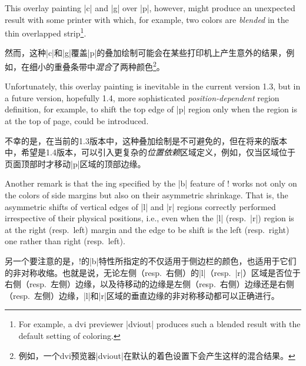 This overlay painting |c| and |g| over |p|, however, might produce an
unexpected result with some printer with which, for example, two colors
are \emph{blended} in the thin overlapped strip\footnote{%
For example, a dvi previewer |dviout| produces such a blended result with
the default setting of coloring.}.

然而，这种|c|和|g|覆盖|p|的叠加绘制可能会在某些打印机上产生意外的结果，例如，在细小的重叠条带中\emph{混合}了两种颜色\footnote{例如，一个dvi预览器|dviout|在默认的着色设置下会产生这样的混合结果。}。

Unfortunately, this overlay painting is inevitable in the current version
1.3, but in a future version, hopefully 1.4, more sophisticated
\emph{position-dependent} region definition, for example, to shift the top
edge of |p| region only when the region is at the top of page, could be
introduced.

不幸的是，在当前的1.3版本中，这种叠加绘制是不可避免的，但在将来的版本中，希望是1.4版本，可以引入更复杂的\emph{位置依赖}区域定义，例如，仅当区域位于页面顶部时才移动|p|区域的顶部边缘。

Another remark is that the \mirror{}ing specified by the |b| feature of
\!\twosided! works not only on the colors of side margins but also on
their asymmetric shrinkage.  That is, the asymmetric shifts of vertical
edges of |l| and |r| regions correctly performed irrespective of their
physical positions, i.e., even when the |l| (resp.\ |r|) region is at
the right (resp.\ left) margin and the edge to be shift is the left
(resp.\ right) one rather than right (resp.\ left).

另一个要注意的是，\!\twosided!的|b|特性所指定的\mirror{}不仅适用于侧边栏的颜色，也适用于它们的非对称收缩。也就是说，无论左侧（resp.\ 右侧）的|l|（resp.\ |r|）区域是否位于右侧（resp.\ 左侧）边缘，以及待移动的边缘是左侧（resp.\ 右侧）边缘还是右侧（resp.\ 左侧）边缘，|l|和|r|区域的垂直边缘的非对称移动都可以正确进行。
